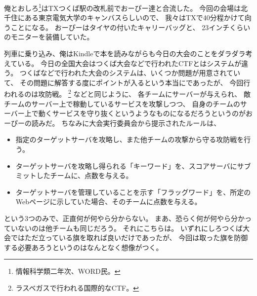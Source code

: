 俺とおしろ\footnote{情報科学類二年次、WORD民。}はTXつくば駅の改札前でおーぴー達と合流した。
今回の会場は北千住にある東京電気大学のキャンバスらしいので、
我々はTXで40分程かけて向うことになる。
おーぴーはタイヤの付いたキャリーバッグと、
23インチくらいのモニターを装備していた。

列車に乗り込み、俺はKindleで本を読みながらも今日の大会のことをダラダラ考えている。
今日の全国大会はつくば大会などで行われたCTFとはシステムが違う。
つくばなどで行われた大会のシステムは、いくつか問題が用意されていて、
その問題に解答する度にポイントが入るという本当にであったが、
今回行われるのは攻防戦。
\DEFCON\footnote{ラスベガスで行われる国際的なCTF。}%
などと同じように、
各チームにサーバーが与えられ、
敵チームのサーバー上で稼動しているサービスを攻撃しつつ、
自身のチームのサーバー上で動くサービスを守り抜くというようなものになるだろうというのがおーぴーの読みだ。
ちなみに大会実行委員会から提示されたルールは、

\begin{itemize}
	\item 指定のターゲットサーバを攻略し、また他チームの攻撃から守る攻防戦を行う。
	\item ターゲットサーバを攻略し得られる「キーワード」を、スコアサーバにサブミットしたチームに、点数を与える。
	\item ターゲットサーバを管理していることを示す「フラッグワード」を、所定のWebページに示していた場合、そのチームに点数を与える。
\end{itemize}

という3つのみで、正直何が何やら分からない。
まあ、恐らく何が何やら分かっていないのは他チームも同じだろう。
それにこちらは。
いずれにしろつくば大会ではただ立っている旗を取れば良いだけであったが、
今回は取った旗を防御する必要あろうというのはなんとなく想像がつく。

